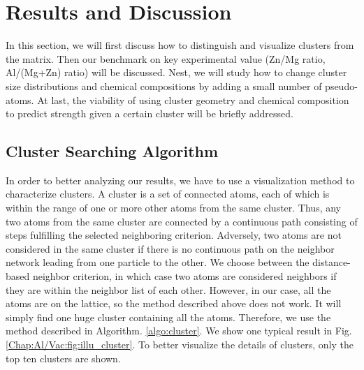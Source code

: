 \section{Results and Discussion}
\label{Chap:Al/Vac:section:RD}

In this section, we will first discuss how to distinguish and visualize clusters from the matrix. Then our benchmark on key experimental value (Zn/Mg ratio, Al/(Mg+Zn) ratio) will be discussed. Nest, we will study how to change cluster size distributions and chemical compositions by adding a small number of pseudo-atoms. At last, the viability of using cluster geometry and chemical composition to predict strength given a certain cluster will be briefly addressed.


\subsection{Cluster Searching Algorithm}

In order to better analyzing our results, we have to use a visualization method to characterize clusters. A cluster is a set of connected atoms, each of which is within the range of one or more other atoms from the same cluster. Thus, any two atoms from the same cluster are connected by a continuous path consisting of steps fulfilling the selected neighboring criterion. Adversely, two atoms are not considered in the same cluster if there is no continuous path on the neighbor network leading from one particle to the other. We choose between the distance-based neighbor criterion, in which case two atoms are considered neighbors if they are within the neighbor list of each other. However, in our case, all the atoms are on the lattice, so the method described above does not work. It will simply find one huge cluster containing all the atoms. Therefore, we use the method described in Algorithm. \ref{algo:cluster}. We show one typical result in Fig. \ref{Chap:Al/Vac:fig:illu_cluster}. To better visualize the details of clusters,  only the top ten clusters are shown. 


